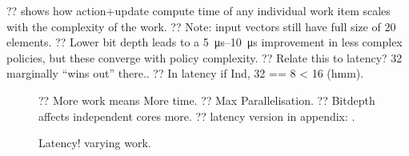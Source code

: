 \documentclass[sigconf,natbib=false]{acmart}
\newcommand{\Indfw}{Ind}
\begin{document}
??  shows how action+update compute time of any individual work item scales with the complexity of the work.
?? Note: input vectors still have full size of 20 elements.
?? Lower bit depth leads to a \SIrange{5}{10}{\micro\second} improvement in less complex policies, but these converge with policy complexity.
?? Relate this to latency? \SI{32}{\bit} marginally ``wins out'' there..
?? In latency if \Indfw{}, 32 == 8 < 16 (hmm).

\begin{figure}
	\caption{?? More work means More time. ?? Max Parallelisation. ?? Bitdepth affects independent cores more. ?? latency version in appendix: .\label{fig:vary-work}}
\end{figure}

\begin{figure}
	\caption{Latency! varying work.\label{fig:vary-work-latency}}
\end{figure}
\end{document}
